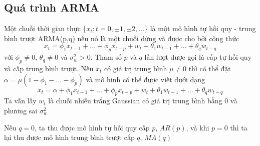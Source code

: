  
\subsection{Quá trình ARMA}
\begin{defi}
Một chuỗi thời gian thực \{$x_t; t=0,\pm1,\pm2,\dots$\} là một mô hình tự hồi quy - trung bình trượt ARMA(p,q) nếu nó là một chuỗi dừng và được cho bởi công thức
\begin{equation}\label{equa:arma}
	x_t = \phi_1x_{t-1}+\dots+\phi_px_{t-p}+w_t+\theta_1w_{t-1}+\dots+\theta_qw_{t-q}
\end{equation}
với $\phi_p \neq 0$, $\theta_q \neq 0$ và $\sigma_{w}^{2} > 0$. Tham số $p$ và $q$ lần lượt được gọi là cấp tự hồi quy và cấp trung bình trượt. Nếu $x_t$ có giá trị trung bình $\mu \neq 0$ thì có thể đặt $\alpha = \mu(1-\phi_1-\dots-\phi_p)$ và mô hình có thể được viết dưới dạng
\begin{equation}
  x_t = \alpha + \phi_1x_{t-1}+\dots+\phi_px_{t-p}+w_t+\theta_1w_{t-1}+\dots+\theta_qw_{t-q}
\end{equation}
Ta vẫn lấy $w_t$ là chuỗi nhiễu trắng Gaussian có giá trị trung bình bằng 0 và phương sai $\sigma_{w}^{2}$
\end{defi}
Nếu $q = 0$, ta thu được mô hình tự hồi quy cấp $p$, $AR(p)$, và khi $p = 0$ thì ta lại thu được mô hình trung bình trượt cấp $q$, $MA(q)$

